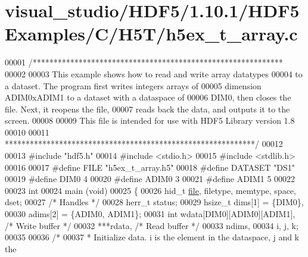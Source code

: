 \hypertarget{visual__studio_2_h_d_f5_21_810_81_2_h_d_f5_examples_2_c_2_h5_t_2h5ex__t__array_8c_source}{}\section{visual\+\_\+studio/\+H\+D\+F5/1.10.1/\+H\+D\+F5\+Examples/\+C/\+H5\+T/h5ex\+\_\+t\+\_\+array.c}
\label{visual__studio_2_h_d_f5_21_810_81_2_h_d_f5_examples_2_c_2_h5_t_2h5ex__t__array_8c_source}

\begin{DoxyCode}
00001 \textcolor{comment}{/************************************************************}
00002 \textcolor{comment}{}
00003 \textcolor{comment}{  This example shows how to read and write array datatypes}
00004 \textcolor{comment}{  to a dataset.  The program first writes integers arrays of}
00005 \textcolor{comment}{  dimension ADIM0xADIM1 to a dataset with a dataspace of}
00006 \textcolor{comment}{  DIM0, then closes the  file.  Next, it reopens the file,}
00007 \textcolor{comment}{  reads back the data, and outputs it to the screen.}
00008 \textcolor{comment}{}
00009 \textcolor{comment}{  This file is intended for use with HDF5 Library version 1.8}
00010 \textcolor{comment}{}
00011 \textcolor{comment}{ ************************************************************/}
00012 
00013 \textcolor{preprocessor}{#include "hdf5.h"}
00014 \textcolor{preprocessor}{#include <stdio.h>}
00015 \textcolor{preprocessor}{#include <stdlib.h>}
00016 
00017 \textcolor{preprocessor}{#define FILE            "h5ex\_t\_array.h5"}
00018 \textcolor{preprocessor}{#define DATASET         "DS1"}
00019 \textcolor{preprocessor}{#define DIM0            4}
00020 \textcolor{preprocessor}{#define ADIM0           3}
00021 \textcolor{preprocessor}{#define ADIM1           5}
00022 
00023 \textcolor{keywordtype}{int}
00024 main (\textcolor{keywordtype}{void})
00025 \{
00026     hid\_t       \hyperlink{structfile}{file}, filetype, memtype, space, dset;
00027                                                 \textcolor{comment}{/* Handles */}
00028     herr\_t      status;
00029     hsize\_t     dims[1] = \{DIM0\},
00030                 adims[2] = \{ADIM0, ADIM1\};
00031     \textcolor{keywordtype}{int}         wdata[DIM0][ADIM0][ADIM1],      \textcolor{comment}{/* Write buffer */}
00032                 ***rdata,                       \textcolor{comment}{/* Read buffer */}
00033                 ndims,
00034                 i, j, k;
00035 
00036     \textcolor{comment}{/*}
00037 \textcolor{comment}{     * Initialize data.  i is the element in the dataspace, j and k the}

\end{DoxyCode}
